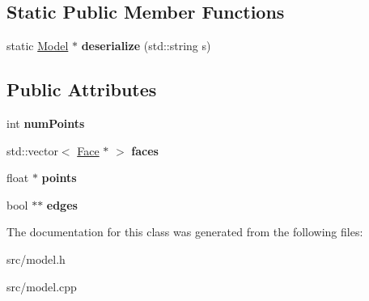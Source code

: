 \subsection*{Static Public Member Functions}
\begin{DoxyCompactItemize}
\item 
\mbox{\label{class_model_a98946d1c8d49b43f541dbd6b98b31e52}} 
static \mbox{\hyperlink{class_model}{Model}} $\ast$ {\bfseries deserialize} (std\+::string s)
\end{DoxyCompactItemize}
\subsection*{Public Attributes}
\begin{DoxyCompactItemize}
\item 
\mbox{\label{class_model_a39ac6e91375d5ac5799a9845c3479d9c}} 
int {\bfseries num\+Points}
\item 
\mbox{\label{class_model_a7752ae8e1bbacc53ed94d7bd9c404b6d}} 
std\+::vector$<$ \mbox{\hyperlink{class_face}{Face}} $\ast$ $>$ {\bfseries faces}
\item 
\mbox{\label{class_model_a6436acbcf42bece5621666fe37c71309}} 
float $\ast$ {\bfseries points}
\item 
\mbox{\label{class_model_a723a0c631c2ff688fed06c5652879ef7}} 
bool $\ast$$\ast$ {\bfseries edges}
\end{DoxyCompactItemize}


The documentation for this class was generated from the following files\+:\begin{DoxyCompactItemize}
\item 
src/model.\+h\item 
src/model.\+cpp\end{DoxyCompactItemize}

